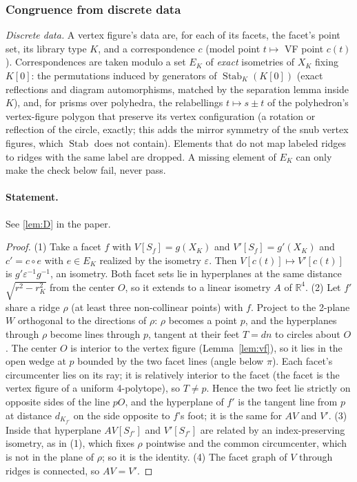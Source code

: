 \documentclass[11pt]{article}
\theoremstyle{definition}
\theoremstyle{remark}
\newcommand{\R}{\mathbb{R}}
\newcommand{\Stab}{\operatorname{Stab}}
\begin{document}
\subsubsection{Congruence from discrete data}

\emph{Discrete data.} A vertex figure's data are, for each of its facets,
the facet's point set, its library type $K$, and a correspondence $c$ (model
point $t\mapsto$ VF point $c(t)$). Correspondences are taken modulo a set
$E_K$ of \emph{exact} isometries of $X_K$ fixing $K[0]$: the permutations
induced by generators of $\Stab_K(K[0])$ (exact reflections and diagram
automorphisms, matched by the separation lemma inside $K$), and, for prisms
over polyhedra, the relabellings $t\mapsto s\pm t$ of the polyhedron's
vertex-figure polygon that preserve its vertex configuration (a rotation or
reflection of the circle, exactly; this adds the mirror symmetry of the
snub vertex figures, which $\Stab$ does not contain). Elements that do not
map labeled ridges to ridges with the same label are dropped. A missing
element of $E_K$ can only make the check below fail, never pass.

\paragraph{Statement.} See \ref{lem:D} in the paper.

\begin{proof}
(1) Take a facet $f$ with $V[S_f]=g(X_K)$ and $V'[S_f]=g'(X_K)$ and
$c'=c\circ e$ with $e\in E_K$ realized by the isometry $\varepsilon$. Then
$V[c(t)]\mapsto V'[c(t)]$ is $g'\varepsilon^{-1}g^{-1}$, an isometry. Both
facet sets lie in hyperplanes at the same distance $\sqrt{r^2-r_K^2}$ from
the center $O$, so it extends to a linear isometry $A$ of $\R^4$.
(2) Let $f'$ share a ridge $\rho$ (at least three non-collinear points)
with $f$. Project to the 2-plane $W$ orthogonal to the directions of
$\rho$: $\rho$ becomes a point $p$, and the hyperplanes through $\rho$
become lines through $p$, tangent at their feet $T=dn$ to circles about
$O$. The center $O$ is interior to the vertex figure (Lemma~\ref{lem:vf}),
so it lies in the open wedge at $p$ bounded by the two facet lines (angle
below $\pi$). Each facet's circumcenter lies on its ray; it is relatively
interior to the facet (the facet is the vertex figure of a uniform
4-polytope), so $T\ne p$. Hence the two feet lie strictly on opposite
sides of the line $pO$, and the hyperplane of $f'$ is the tangent line from
$p$ at distance $d_{K_{f'}}$ on the side opposite to $f$'s foot; it is the
same for $AV$ and $V'$. (3) Inside that hyperplane $AV[S_{f'}]$ and
$V'[S_{f'}]$ are related by an index-preserving isometry, as in (1), which
fixes $\rho$ pointwise and the common circumcenter, which is not in the
plane of $\rho$; so it is the identity. (4) The facet graph of $V$ through
ridges is connected, so $AV=V'$.
\end{proof}
\end{document}
